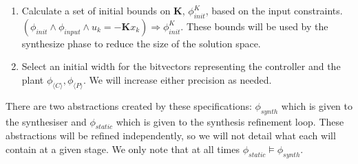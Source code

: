 \documentclass[sigconf]{llncs}
\newcommand{\mat}[1]{\boldsymbol{#1}}
\begin{document}
\begin{enumerate}
\begin{enumerate}
\item Calculate a set of initial bounds on $\mat{K}$, $\phi_\mathit{init}^{K}$,
based on the input constraints.
%
$(\phi_\mathit{init} \wedge \phi_\mathit{input} \wedge u_k=-\mat{K} x_k)
\Rightarrow \phi_\mathit{init}^{K}$.
These bounds will be used by the {\sc synthesize} phase to reduce the size of the solution space. 
\item Select an initial width for the bitvectors representing the controller and the plant $\phi_{\langle C \rangle}, \phi_{\langle P \rangle}$. We will increase either precision as needed.
\end{enumerate}
There are two abstractions created by these specifications: $\phi_{synth}$ which is given to the synthesiser and $\phi_{static}$ which is given to the synthesis refinement loop. These abstractions will be refined independently, so we will not detail what each will contain at a given stage. We only note that at all times $\phi_{static} \models \phi_{synth}$.


\end{enumerate}
\end{document}
